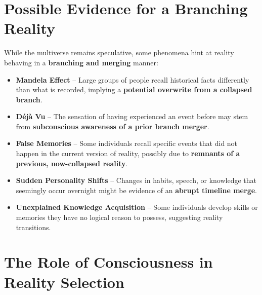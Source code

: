 \documentclass{article}
\begin{document}
\section{Possible Evidence for a Branching Reality}
While the multiverse remains speculative, some phenomena hint at reality behaving in a \textbf{branching and merging} manner:
\begin{itemize}
    \item \textbf{Mandela Effect} – Large groups of people recall historical facts differently than what is recorded, implying a \textbf{potential overwrite from a collapsed branch}.
    \item \textbf{D\'ej\`a Vu} – The sensation of having experienced an event before may stem from \textbf{subconscious awareness of a prior branch merger}.
    \item \textbf{False Memories} – Some individuals recall specific events that did not happen in the current version of reality, possibly due to \textbf{remnants of a previous, now-collapsed reality}.
    \item \textbf{Sudden Personality Shifts} – Changes in habits, speech, or knowledge that seemingly occur overnight might be evidence of an \textbf{abrupt timeline merge}.
    \item \textbf{Unexplained Knowledge Acquisition} – Some individuals develop skills or memories they have no logical reason to possess, suggesting reality transitions.
\end{itemize}

\section{The Role of Consciousness in Reality Selection}
\end{document}
